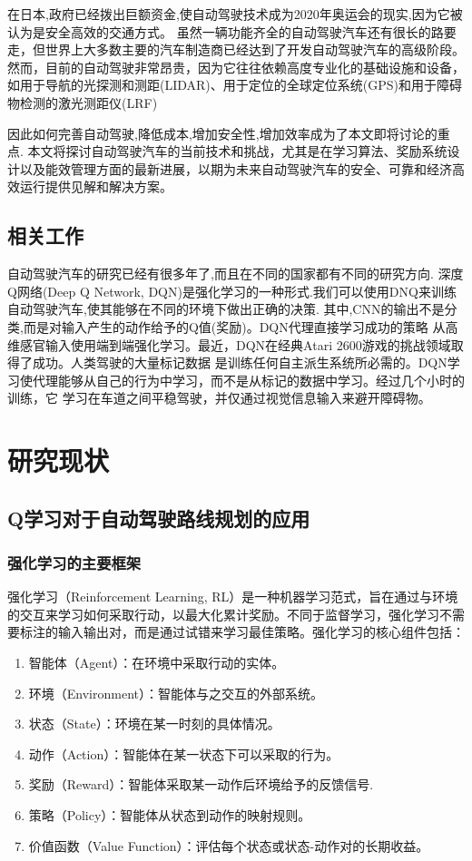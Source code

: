 \documentclass{article}
\begin{document}
在日本,政府已经拨出巨额资金,使自动驾驶技术成为2020年奥运会的现实,因为它被认为是安全高效的交通方式。
虽然一辆功能齐全的自动驾驶汽车还有很长的路要走，但世界上大多数主要的汽车制造商已经达到了开发自动驾驶汽车的高级阶段。
然而，目前的自动驾驶非常昂贵，因为它往往依赖高度专业化的基础设施和设备，如用于导航的光探测和测距(LIDAR)、用于定位的全球定位系统(GPS)和用于障碍物检测的激光测距仪(LRF)\cite{Aly2008RealTD}

因此如何完善自动驾驶,降低成本,增加安全性,增加效率成为了本文即将讨论的重点.
本文将探讨自动驾驶汽车的当前技术和挑战，尤其是在学习算法、奖励系统设计以及能效管理方面的最新进展，以期为未来自动驾驶汽车的安全、可靠和经济高效运行提供见解和解决方案。

\subsection{相关工作}
自动驾驶汽车的研究已经有很多年了,而且在不同的国家都有不同的研究方向.
深度Q网络(Deep Q Network, DQN)是强化学习的一种形式.我们可以使用DNQ来训练自动驾驶汽车,使其能够在不同的环境下做出正确的决策.
其中,CNN的输出不是分类,而是对输入产生的动作给予的Q值(奖励)。DQN代理直接学习成功的策略
从高维感官输入使用端到端强化学习。最近，DQN在经典Atari 2600游戏的挑战领域取得了成功\cite{mnih2015human}。人类驾驶的大量标记数据
是训练任何自主派生系统所必需的。DQN学习使代理能够从自己的行为中学习，而不是从标记的数据中学习。经过几个小时的训练，它
学习在车道之间平稳驾驶，并仅通过视觉信息输入来避开障碍物。\cite{8494053}

\section{研究现状}

\subsection{Q学习对于自动驾驶路线规划的应用}

\subsubsection{强化学习的主要框架}
强化学习（Reinforcement Learning, RL）是一种机器学习范式，旨在通过与环境的交互来学习如何采取行动，以最大化累计奖励。不同于监督学习，强化学习不需要标注的输入输出对，而是通过试错来学习最佳策略。强化学习的核心组件包括：
\begin{enumerate}
    \item 智能体（Agent）：在环境中采取行动的实体。
    \item 环境（Environment）：智能体与之交互的外部系统。
    \item 状态（State）：环境在某一时刻的具体情况。
    \item 动作（Action）：智能体在某一状态下可以采取的行为。
    \item 奖励（Reward）：智能体采取某一动作后环境给予的反馈信号.
    \item 策略（Policy）：智能体从状态到动作的映射规则。
    \item 价值函数（Value Function）：评估每个状态或状态-动作对的长期收益。
\end{enumerate}
\end{document}
